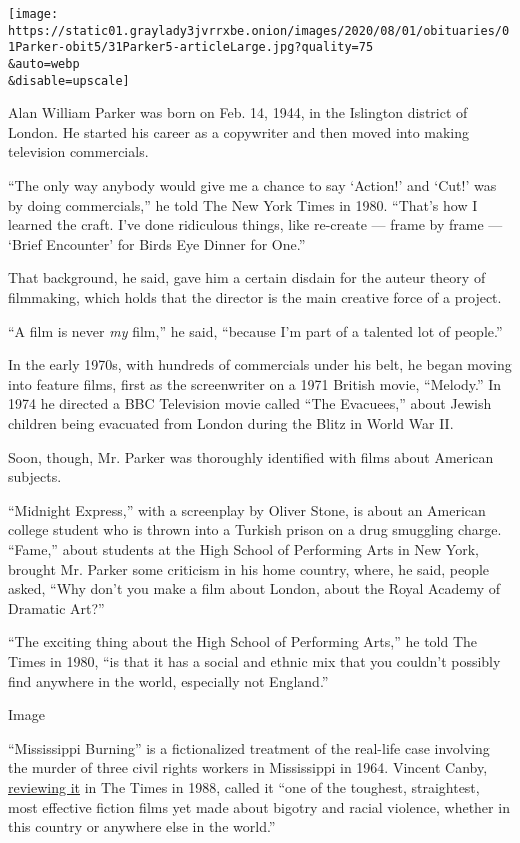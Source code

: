 \texttt{[image: https://static01.graylady3jvrrxbe.onion/images/2020/08/01/obituaries/01Parker-obit5/31Parker5-articleLarge.jpg?quality=75\\\&auto=webp\\\&disable=upscale]}

Alan William Parker was born on Feb. 14, 1944, in the Islington district
of London. He started his career as a copywriter and then moved into
making television commercials.

``The only way anybody would give me a chance to say `Action!' and
`Cut!' was by doing commercials,'' he told The New York Times in 1980.
``That's how I learned the craft. I've done ridiculous things, like
re-create --- frame by frame --- `Brief Encounter' for Birds Eye Dinner
for One.''

That background, he said, gave him a certain disdain for the auteur
theory of filmmaking, which holds that the director is the main creative
force of a project.

``A film is never \emph{my} film,'' he said, ``because I'm part of a
talented lot of people.''

In the early 1970s, with hundreds of commercials under his belt, he
began moving into feature films, first as the screenwriter on a 1971
British movie, ``Melody.'' In 1974 he directed a BBC Television movie
called ``The Evacuees,'' about Jewish children being evacuated from
London during the Blitz in World War II.

Soon, though, Mr. Parker was thoroughly identified with films about
American subjects.

``Midnight Express,'' with a screenplay by Oliver Stone, is about an
American college student who is thrown into a Turkish prison on a drug
smuggling charge. ``Fame,'' about students at the High School of
Performing Arts in New York, brought Mr. Parker some criticism in his
home country, where, he said, people asked, ``Why don't you make a film
about London, about the Royal Academy of Dramatic Art?''

``The exciting thing about the High School of Performing Arts,'' he told
The Times in 1980, ``is that it has a social and ethnic mix that you
couldn't possibly find anywhere in the world, especially not England.''

Image

``Mississippi Burning'' is a fictionalized treatment of the real-life
case involving the murder of three civil rights workers in Mississippi
in 1964. Vincent Canby,
\href{https://www.nytimes3xbfgragh.onion/1988/12/09/movies/review-film-retracing-mississippi-s-agony-1964.html}{reviewing
it} in The Times in 1988, called it ``one of the toughest, straightest,
most effective fiction films yet made about bigotry and racial violence,
whether in this country or anywhere else in the world.''

